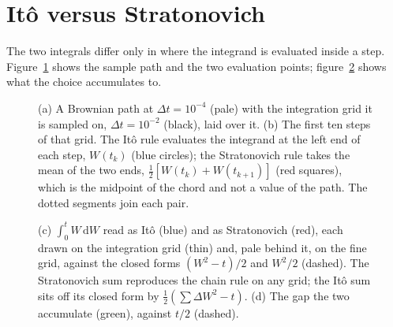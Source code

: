 \documentclass[10pt]{article}
\begin{document}
\section*{It\^o versus Stratonovich}

The two integrals differ only in where the integrand is evaluated inside a step.
Figure~\ref{fig:path} shows the sample path and the two evaluation points;
figure~\ref{fig:integrals} shows what the choice accumulates to.

\begin{figure}[t]
  \centering
  
  \caption{(a) A Brownian path at $\Delta t=10^{-4}$ (pale) with the integration
    grid it is sampled on, $\Delta t=10^{-2}$ (black), laid over it. (b) The
    first ten steps of that grid. The It\^o rule evaluates the integrand at the
    left end of each step, $W(t_k)$ (\textcolor{itoblue}{blue circles}); the
    Stratonovich rule takes the mean of the two ends,
    $\tfrac{1}{2}[W(t_k)+W(t_{k+1})]$ (\textcolor{stratred}{red squares}), which
    is the midpoint of the chord and not a value of the path. The dotted segments
    join each pair.}
  \label{fig:path}
\end{figure}

\begin{figure}[t]
  \centering
  
  \caption{(c) $\int_0^t W\,\mathrm{d}W$ read as It\^o
    (\textcolor{itoblue}{blue}) and as Stratonovich (\textcolor{stratred}{red}),
    each drawn on the integration grid (thin) and, pale behind it, on the fine
    grid, against the closed forms $(W^2-t)/2$ and $W^2/2$ (dashed). The
    Stratonovich sum reproduces the chain rule on any grid; the It\^o sum sits
    off its closed form by $\tfrac{1}{2}(\sum \Delta W^2 - t)$. (d) The gap the
    two accumulate (\textcolor{diffgreen}{green}), against $t/2$ (dashed).}
  \label{fig:integrals}
\end{figure}
\end{document}
